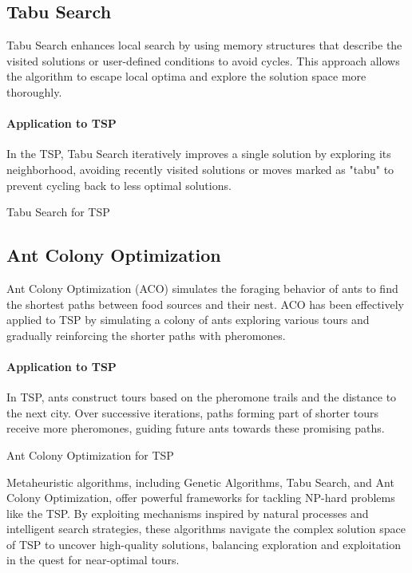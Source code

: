 \subsection{Tabu Search}

Tabu Search enhances local search by using memory structures that describe the visited solutions or user-defined conditions to avoid cycles. This approach allows the algorithm to escape local optima and explore the solution space more thoroughly.

\paragraph{Application to TSP}

In the TSP, Tabu Search iteratively improves a single solution by exploring its neighborhood, avoiding recently visited solutions or moves marked as "tabu" to prevent cycling back to less optimal solutions.

\begin{algorithm}
	\caption{Tabu Search for TSP}\label{alg:tabusearch}
\end{algorithm}

\subsection{Ant Colony Optimization}

Ant Colony Optimization (ACO) simulates the foraging behavior of ants to find the shortest paths between food sources and their nest. ACO has been effectively applied to TSP by simulating a colony of ants exploring various tours and gradually reinforcing the shorter paths with pheromones.

\paragraph{Application to TSP}

In TSP, ants construct tours based on the pheromone trails and the distance to the next city. Over successive iterations, paths forming part of shorter tours receive more pheromones, guiding future ants towards these promising paths.

\begin{algorithm}
	\caption{Ant Colony Optimization for TSP}\label{alg:antcolonyoptimization}
\end{algorithm}

Metaheuristic algorithms, including Genetic Algorithms, Tabu Search, and Ant Colony Optimization, offer powerful frameworks for tackling NP-hard problems like the TSP. By exploiting mechanisms inspired by natural processes and intelligent search strategies, these algorithms navigate the complex solution space of TSP to uncover high-quality solutions, balancing exploration and exploitation in the quest for near-optimal tours.
